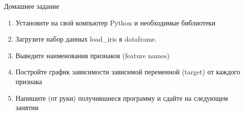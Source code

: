 \documentclass[landscape]{slides}
\begin{document}
\begin{slide}
Домашнее задание
\begin{enumerate}
\item Установите на свой компьютер Python и необходимые библиотеки
\item Загрузите набор данных load\_iris в dataframe.
\item Выведите наименования признаков (feature names)
\item Постройте график зависимости зависимой переменной (target) от каждого признака
\item Напишите (от руки) получившиеся программу и сдайте на следующем занятии
\end{enumerate}	
\end{slide}
\end{document}
